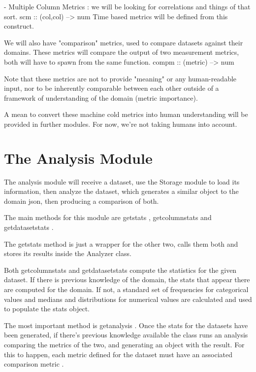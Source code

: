   - Multiple Column Metrics : we will be looking for correlations and things of that sort.
    scm :: (col,col) --> num 
    Time based metrics will be defined from this construct.

We will also have "comparison" metrics, used to compare datasets against their domains.
These metrics will compare the output of two measurement metrics, both will have to
spawn from the same function.
  compm :: (metric) --> num

Note that these metrics are not to provide "meaning" or any human-readable input, nor to be
inherently comparable between each other outside of a framework of understanding of the domain
(metric importance).

A mean to convert these machine cold metrics into human understanding will be provided in further 
modules. For now, we're not taking humans into account.

\section{The Analysis Module}
\label{cap2:sec:analysis}

The analysis module will receive a dataset, use the Storage module to load its information, then analyze the dataset, which generates a similar object to the domain json, then producing a comparison of both.

The main methods for this module are  getstats ,  getcolumnstats  and  getdatasetstats .

The  getstats  method is just a wrapper for the other two, calls them both and stores its results inside the Analyzer class.

Both  getcolumnstats  and  getdatasetstats  compute the statistics for the given dataset. If there is previous knowledge of the domain, the stats that appear there are computed for the domain. If not, a standard set of frequencies for categorical values and medians and distributions for numerical values are calculated and used to populate the stats object.

The most important method is  getanalysis . Once the stats for the datasets have been generated, if there's previous knowledge available the class runs an analysis comparing the metrics of the two, and generating an object with the result. For this to happen, each metric defined for the dataset must have an associated  comparison metric .

